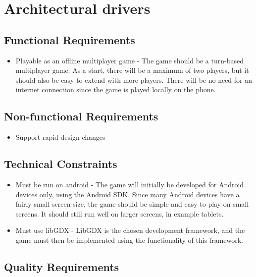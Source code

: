 \chapter{Architectural drivers}

\section{Functional Requirements}
\begin{itemize}
	\item{Playable as an offline multiplayer game - The game should be a turn-based multiplayer game. As a start, there will be a maximum of two players, but it should also be easy to extend with more players. There will be no need for an internet connection since the game is played locally on the phone.}
\end{itemize}

\section{Non-functional Requirements}
\begin{itemize}
	\item{Support rapid design changes}
\end{itemize}

\section{Technical Constraints}

\begin{itemize}
	\item{Must be run on android - The game will initially be developed for Android devices only, using the Android SDK. Since many Android devices have a fairly small screen size, the game should be simple and easy to play on small screens. It should still run well on larger screens, in example tablets.}
	\item{Must use libGDX - LibGDX is the chosen development framework, and the game must then be implemented using the functionality of this framework.}
\end{itemize}

\section{Quality Requirements}

